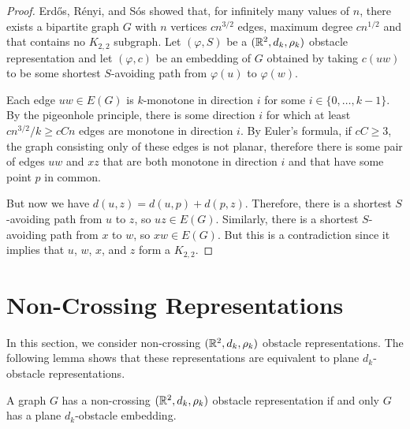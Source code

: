 \documentclass{patmorin}
\begin{document}
\begin{proof}
   Erd\H{o}s, R\'enyi, and S\'os \cite{erdos.renyi.ea:1966} showed that,
   for infinitely many values of $n$, there exists a bipartite graph
   $G$ with $n$ vertices $cn^{3/2}$ edges, maximum degree $cn^{1/2}$
   and that contains no $K_{2,2}$ subgraph.  Let $(\varphi,S)$ be a
   $(\mathbb{R}^2,d_k,\rho_k)$ obstacle representation and let $(\varphi,c)$
   be an embedding of $G$ obtained by taking $c(uw)$ to be some shortest
   $S$-avoiding path from $\varphi(u)$ to $\varphi(w)$.

   Each edge $uw\in E(G)$ is $k$-monotone in direction $i$ for some
   $i\in\{0,\ldots,k-1\}$.  By the pigeonhole principle, there is
   some direction $i$ for which at least $cn^{3/2}/k\ge cCn$ edges
   are monotone in direction $i$.  By Euler's formula, if $cC\ge 3$,
   the graph consisting only of these edges is not planar, therefore
   there is some pair of edges $uw$ and $xz$ that are both monotone in
   direction $i$ and that have some point $p$ in common.

   But now we have $d(u,z)=d(u,p)+d(p,z)$.  Therefore, there is a shortest
   $S$-avoiding path from $u$ to $z$, so $uz\in E(G)$.  Similarly, there
   is a shortest $S$-avoiding path from $x$ to $w$, so $xw\in E(G)$.
   But this is a contradiction since it implies that $u$, $w$, $x$,
   and $z$ form a $K_{2,2}$.
\end{proof}


\section{Non-Crossing Representations}

In this section, we consider non-crossing $(\mathbb{R}^2,d_k,\rho_k)$ obstacle
representations. The following lemma shows that these representations
are equivalent to plane $d_k$-obstacle representations.

\begin{lem}
   A graph $G$ has a non-crossing $(\mathbb{R}^2,d_k,\rho_k)$ obstacle
   representation if and only $G$ has a plane $d_k$-obstacle embedding.
\end{lem}
\end{document}
